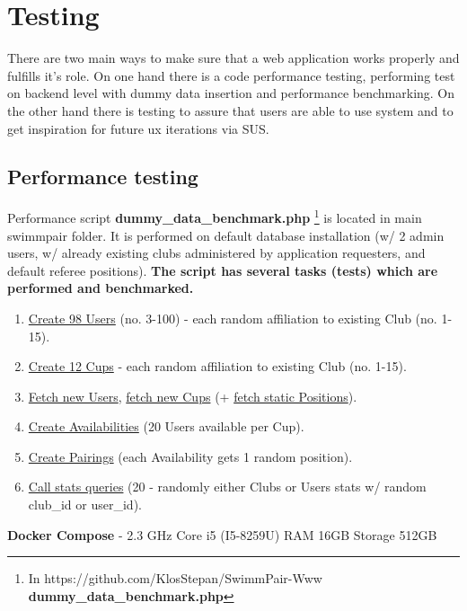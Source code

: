 \chapter{Testing}
There are two main ways to make sure that a web application works properly and fulfills it's role. On one hand there is a code performance testing, performing test on backend level with dummy data insertion and performance benchmarking. On the other hand there is testing to assure that users are able to use system and to get inspiration for future ux iterations via SUS.
\section{Performance testing}
Performance script \textbf{dummy\_data\_benchmark.php} \footnote{In https://github.com/KlosStepan/SwimmPair-Www \textbf{dummy\_data\_benchmark.php}} is located in main swimmpair folder. It is performed on default database installation (w/ 2 admin users, w/ already existing clubs administered by application requesters, and default referee positions).  
\newline
\textbf{The script has several tasks (tests) which are performed and benchmarked.}
\begin{enumerate}
    \item \underline{Create 98 Users} (no. 3-100) - each random affiliation to existing Club (no. 1-15).
    \item \underline{Create 12 Cups} - each random affiliation to existing Club (no. 1-15).
    \item \underline{Fetch new Users}, \underline{fetch new Cups} (+ \underline{fetch static Positions}).
    \item \underline{Create Availabilities} (20 Users available per Cup).
    \item \underline{Create Pairings} (each Availability gets 1 random position).
    \item \underline{Call stats queries} (20 - randomly either Clubs or Users stats w/ random club\_id or user\_id).
\end{enumerate}
\textbf{Docker Compose} - 2.3 GHz Core i5 (I5-8259U) RAM 16GB Storage 512GB
\newline
